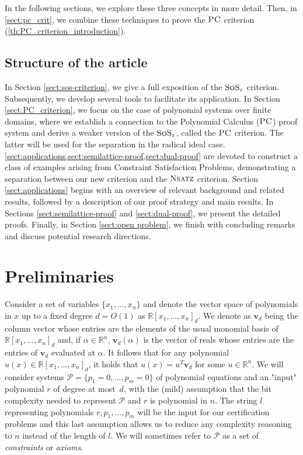 \documentclass[11pt]{article}
\newcommand{\sos}{\text{\sc{SoS}}}
\newcommand{\PC}{\textsc{PC}}
\newcommand{\Nsatz}{\textsc{Nsatz}}
\newcommand{\1}{\textbf{1}}
\begin{document}
In the following sections, we explore these three concepts in more detail. Then, in \cref{sect:pc_crit}, we combine these techniques to prove the $\PC$ criterion (\cref{th:PC_criterion_introduction}).

\subsection{Structure of the article}
In Section \ref{sect:sos-criterion}, we give a full exposition of the $\sos_\varepsilon$ criterion. Subsequently, we develop several tools to facilitate its application. In Section \ref{sect:PC_criterion}, we focus on the case of polynomial systems over finite domains, where we establish a connection to the Polynomial Calculus ($\PC$) proof system and derive a weaker version of the $\sos_\varepsilon$, called the $\PC$ criterion. The latter will be used for the separation in the radical ideal case. \cref{sect:applications,sect:semilattice-proof,sect:dual-proof} are devoted to construct a class of examples arising from Constraint Satisfaction Problems, demonstrating a separation between our new criterion and the $\Nsatz$ criterion. Section \ref{sect:applications} begins with an overview of relevant background and related results, followed by a description of our proof strategy and main results. In Sections \ref{sect:semilattice-proof} and \ref{sect:dual-proof}, we present the detailed proofs. 
Finally, in Section \ref{sect:open problem}, we finish with concluding remarks and discuss potential research directions.

\section{Preliminaries}\label{sect:prelim}
Consider a set of variables $\{x_1,\ldots,x_n\}$ and denote the vector space of polynomials in $x$ up to a fixed degree $d = O(1)$ as $\mathbb{R}[x_1, \dots, x_n]_d$. We denote as $\mathbf{v}_d$ being the column vector whose entries are the elements of the usual monomial basis of $\mathbb{R}[x_1, \dots, x_n]_d$ and, if $\alpha \in \mathbb{R}^n$, $\mathbf{v}_d(\alpha)$ is the vector of reals whose entries are the entries of $\mathbf{v}_d$ evaluated at $\alpha$. It follows that for any polynomial $u(x) \in \mathbb{R}[x_1, \dots, x_n]_d$, it holds that $u(x) = u^{T} \mathbf{v}_d$ for some $u \in \mathbb{R}^n$. 
We will consider systems $\mathcal{P} = \{p_1 = 0,\ldots,p_m = 0\}$ of polynomial equations and an "input" polynomial $r$ of degree at most~$d$, with the (mild) assumption that the bit complexity needed to represent $\mathcal{P}$ and $r$ is polynomial in $n$. The string $l$ representing polynomials $r, p_1, \dots, p_m$ will be the input for our certification problems and this last assumption allows us to reduce any complexity reasoning to $n$ instead of the length of $l$. We will sometimes refer to $\mathcal{P}$ as a set of \emph{constraints} or \emph{axioms}.
\end{document}
